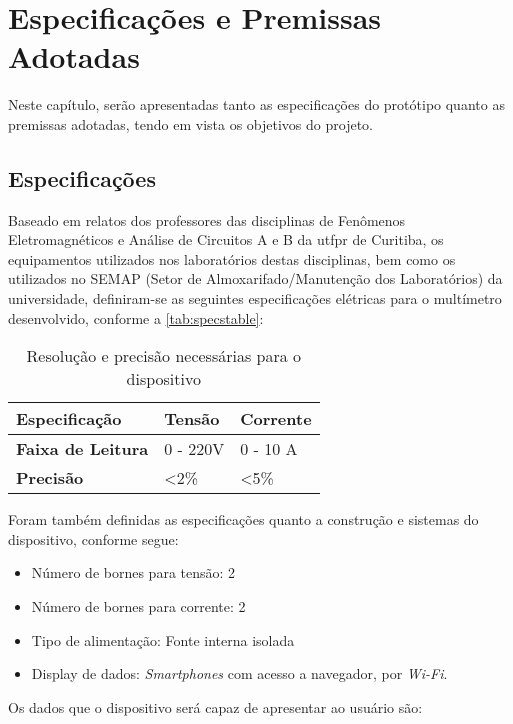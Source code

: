 \chapter{Especificações e Premissas Adotadas}\label{cap:especificacoes}

Neste capítulo, serão apresentadas tanto as especificações do protótipo quanto as premissas adotadas, tendo em vista os objetivos do projeto.

\section{Especificações}\label{spec}
Baseado em relatos dos professores das disciplinas de Fenômenos Eletromagnéticos e Análise de Circuitos A e B da \gls{utfpr} de Curitiba, os equipamentos utilizados nos laboratórios destas disciplinas, bem como os utilizados no \gls{SEMAP} (Setor de Almoxarifado/Manutenção dos Laboratórios) da universidade, definiram-se as seguintes especificações elétricas para o multímetro desenvolvido, conforme a \autoref{tab:specstable}:

\begin{table}[!ht]
    \centering
    \caption{Resolução e precisão necessárias para o dispositivo}
    \label{tab:specstable}
    \begin{tabular}{ l l l }
        \hline
        \textbf{Especificação}    & \textbf{Tensão} & \textbf{Corrente} \\ \hline
        \textbf{Faixa de Leitura} & 0 - 220V        & 0 - 10 A          \\ 
        \textbf{Precisão}         & <2\%            & <5\%              \\ \hline
    \end{tabular}
    \fonte{}
\end{table}

Foram também definidas as especificações quanto a construção e sistemas do dispositivo, conforme segue:

\begin{itemize}
    \item Número de bornes para tensão: 2
    \item Número de bornes para corrente: 2
    \item Tipo de alimentação: Fonte interna isolada
    \item Display de dados: \textit{Smartphones} com acesso a navegador, por \textit{Wi-Fi}.
\end{itemize}

Os dados que o dispositivo será capaz de apresentar ao usuário são:

